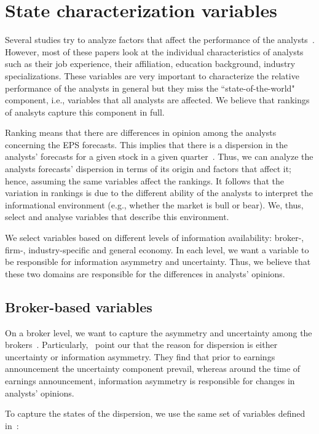 \section{State characterization variables}
\label{ch3-sec:ind.var}
Several studies try to analyze  factors that affect the performance of the analysts~\citep{clement1999,brown2003,jegadeesh2004}.  However, most of these papers look at the individual characteristics of analysts such as their job experience, their affiliation,  education background, industry specializations. These variables are very important to characterize the relative performance of the analysts in general but they miss the ``state-of-the-world" component, i.e., variables that all analysts are affected. We believe that rankings of analsyts capture this component in full.

Ranking means that there are differences in opinion among the analysts concerning the EPS forecasts.  This implies that there is  a dispersion in the analysts' forecasts for a given stock in a given quarter~\citep{diether2002}. Thus, we can analyze  the analysts forecasts' dispersion in terms of its origin and factors that affect it; hence, assuming the same variables affect the rankings. It follows that the variation in rankings is due to the different ability of the analysts to interpret the informational environment (e.g., whether the market is bull or bear). We, thus, select and analyse variables that describe this environment.

We select  variables based on different levels of information availability: broker-,  firm-, industry-specific and general economy. In each level, we want a variable to be responsible for information asymmetry and uncertainty. Thus, we believe that these two domains are responsible for the differences in analysts' opinions.

\subsection{Broker-based variables}
On a broker level, we want to capture the asymmetry and uncertainty among the brokers~\citep{barron1998,barron2009,zhang2006,sheng2012}. Particularly,~\cite{barron2009} point our that the reason for dispersion is either uncertainty or information asymmetry. They find that prior to earnings announcement the uncertainty component prevail, whereas around the time of earnings announcement, information asymmetry is responsible for changes in analysts' opinions.

To capture the states of the dispersion, we use the same set of variables defined in~\cite{barron2009}:

